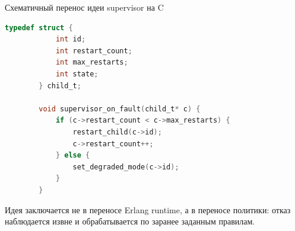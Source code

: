 \begin{frame}[fragile]{Схематичный перенос идеи supervisor на C}
	\begin{lstlisting}[language=C]
		typedef struct {
			int id;
			int restart_count;
			int max_restarts;
			int state;
		} child_t;
		
		void supervisor_on_fault(child_t* c) {
			if (c->restart_count < c->max_restarts) {
				restart_child(c->id);
				c->restart_count++;
			} else {
				set_degraded_mode(c->id);
			}
		}
	\end{lstlisting}
	
	\vspace{0.2cm}
	
	Идея заключается не в переносе Erlang runtime, а в переносе политики:
	отказ наблюдается извне и обрабатывается по заранее заданным правилам.
\end{frame}